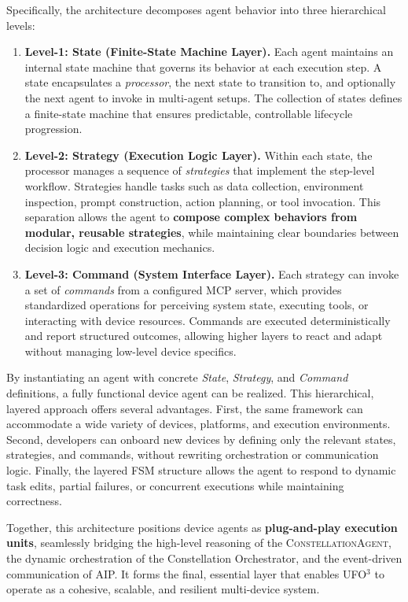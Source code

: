 \documentclass[10pt]{article} %
\newcommand{\ufo}{\textsc{UFO}$^3$\xspace}
\newcommand{\cagent}{\textsc{ConstellationAgent}\xspace}
\begin{document}
Specifically, the architecture decomposes agent behavior into three hierarchical levels:  
\begin{enumerate}
    \item \textbf{Level-1: State (Finite-State Machine Layer).}  
    Each agent maintains an internal state machine that governs its behavior at each execution step. A state encapsulates a \emph{processor}, the next state to transition to, and optionally the next agent to invoke in multi-agent setups. The collection of states defines a finite-state machine that ensures predictable, controllable lifecycle progression.

    \item \textbf{Level-2: Strategy (Execution Logic Layer).}  
    Within each state, the processor manages a sequence of \emph{strategies} that implement the step-level workflow. Strategies handle tasks such as data collection, environment inspection, prompt construction, action planning, or tool invocation. This separation allows the agent to \textbf{compose complex behaviors from modular, reusable strategies}, while maintaining clear boundaries between decision logic and execution mechanics.

    \item \textbf{Level-3: Command (System Interface Layer).}  
    Each strategy can invoke a set of \emph{commands} from a configured MCP server, which provides standardized operations for perceiving system state, executing tools, or interacting with device resources. Commands are executed deterministically and report structured outcomes, allowing higher layers to react and adapt without managing low-level device specifics.
\end{enumerate}
By instantiating an agent with concrete \emph{State}, \emph{Strategy}, and \emph{Command} definitions, a fully functional device agent can be realized. This hierarchical, layered approach offers several advantages. First, the same framework can accommodate a wide variety of devices, platforms, and execution environments.  Second, developers can onboard new devices by defining only the relevant states, strategies, and commands, without rewriting orchestration or communication logic. Finally, the layered FSM structure allows the agent to respond to dynamic task edits, partial failures, or concurrent executions while maintaining correctness.  

Together, this architecture positions device agents as \textbf{plug-and-play execution units}, seamlessly bridging the high-level reasoning of the \cagent, the dynamic orchestration of the Constellation Orchestrator, and the event-driven communication of AIP. It forms the final, essential layer that enables \ufo to operate as a cohesive, scalable, and resilient multi-device system.
\end{document}
